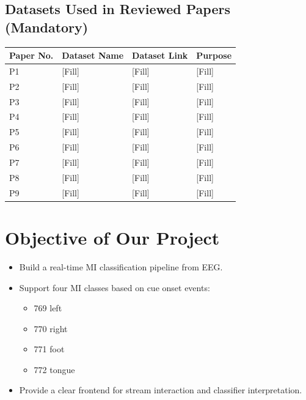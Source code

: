 \documentclass[12pt,a4paper]{article}
\begin{document}
\subsection{Datasets Used in Reviewed Papers (Mandatory)}
\begin{longtable}{p{}p{}p{}p{}}
\toprule
\textbf{Paper No.} & \textbf{Dataset Name} & \textbf{Dataset Link} & \textbf{Purpose} \\
\midrule
P1 & [Fill] & [Fill] & [Fill] \\
P2 & [Fill] & [Fill] & [Fill] \\
P3 & [Fill] & [Fill] & [Fill] \\
P4 & [Fill] & [Fill] & [Fill] \\
P5 & [Fill] & [Fill] & [Fill] \\
P6 & [Fill] & [Fill] & [Fill] \\
P7 & [Fill] & [Fill] & [Fill] \\
P8 & [Fill] & [Fill] & [Fill] \\
P9 & [Fill] & [Fill] & [Fill] \\
\bottomrule
\end{longtable}

\section{Objective of Our Project}
\begin{itemize}[leftmargin=1.5em]
  \item Build a real-time MI classification pipeline from EEG.
  \item Support four MI classes based on cue onset events:
  \begin{itemize}[leftmargin=1.5em]
    \item 769 left
    \item 770 right
    \item 771 foot
    \item 772 tongue
  \end{itemize}
  \item Provide a clear frontend for stream interaction and classifier interpretation.
\end{itemize}
\end{document}
